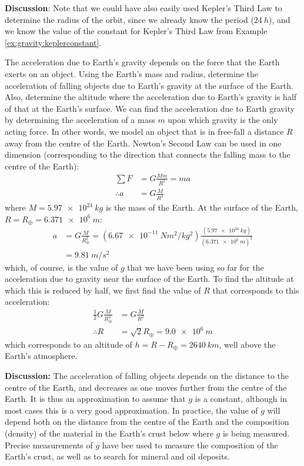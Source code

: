 \begin{example}
\textbf{Discussion}: Note that we could have also easily used Kepler's Third Law to determine the radius of the orbit, since we already know the period ($\SI{24}{h}$), and we know the value of the constant for Kepler's Third Law from Example \ref{ex:gravity:keplerconstant}.
\end{example}

\begin{example}{\label{ex:gravity:gofr}The acceleration due to Earth's gravity depends on the force that the Earth exerts on an object. Using the Earth's mass and radius, determine the acceleration of falling objects due to Earth's gravity at the surface of the Earth. Also, determine the altitude where the acceleration due to Earth's gravity is half of that at the Earth's surface.}
We can find the acceleration due to Earth gravity by determining the acceleration of a mass $m$ upon which gravity is the only acting force. In other words, we model an object that is in free-fall a distance $R$ away from the centre of the Earth. Newton's Second Law can be used in one dimension (corresponding to the direction that connects the falling mass to the centre of the Earth):
\begin{align*}
\sum F &= G\frac{Mm}{R^2}=ma\\
\therefore a&=G\frac{M}{R^2}
\end{align*}
where $M=\SI{5.97e24}{kg}$ is the mass of the Earth. At the surface of the Earth, $R=R_\oplus=\SI{6.371e6}{m}$:
\begin{align*}
a&=G\frac{M}{R_\oplus^2}=(\SI{6.67e-11}{Nm^2/kg^2})\frac{(\SI{5.97e24}{kg})}{(\SI{6.371e6}{m})^2}\\
&=\SI{9.81}{m/s^2}
\end{align*}
which, of course, is the value of $g$ that we have been using so far for the acceleration due to gravity near the surface of the Earth. To find the altitude at which this is reduced by half, we first find the value of $R$ that corresponds to this acceleration:
\begin{align*}
\frac{1}{2}G\frac{M}{R_\oplus^2}&=G\frac{M}{R^2}\\
\therefore R &=\sqrt{2}R_\oplus = \SI{9.0e6}{m}
\end{align*}
which corresponds to an altitude of $h=R-R_\oplus=\SI{2640}{km}$, well above the Earth's atmosphere.

\textbf{Discussion:} The acceleration of falling objects depends on the distance to the centre of the Earth, and decreases as one moves further from the centre of the Earth. It is thus an approximation to assume that $g$ is a constant, although in most cases this is a very good approximation. In practice, the value of $g$ will depend both on the distance from the centre of the Earth and the composition (density) of the material in the Earth's crust below where $g$ is being measured. Precise measurements of $g$ have bee used to measure the composition of the Earth's crust, as well as to search for mineral and oil deposits.
\end{example}

